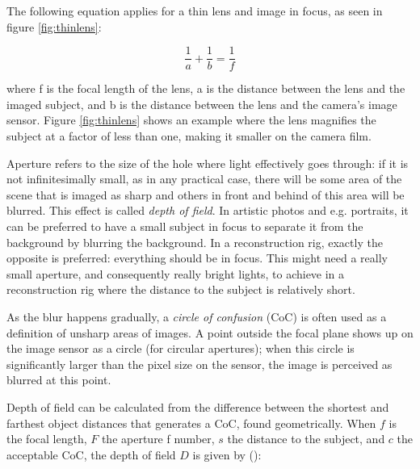 The following equation applies for a thin lens and image in focus, as seen in figure \ref{fig:thinlens}:

\begin{equation}
	\frac{1}{a} + \frac{1}{b} = \frac{1}{f} \label{eq:focal}
\end{equation}


where f is the focal length of the lens, a is the distance between the lens and the imaged subject, and b is the distance between the lens and the camera's image sensor. Figure \ref{fig:thinlens} shows an example where the lens magnifies the subject at a factor of less than one, making it smaller on the camera film.



Aperture refers to the size of the hole where light effectively goes through: %
if it is not infinitesimally small, as in any practical case, there will be some area of the scene that is imaged as sharp and others in front and behind of this area will be blurred.
This effect is called \emph{depth of field}.
In artistic photos and e.g. portraits, it can be preferred to have a small subject in focus to separate it from the background by blurring the background.
In a reconstruction rig, exactly the opposite is preferred: everything should be in focus.
This might need a really small aperture, and consequently really bright lights, to achieve in a reconstruction rig where the distance to the subject is relatively short.

As the blur happens gradually, a \emph{circle of confusion} (CoC) is often used as a definition of unsharp areas of images.
A point outside the focal plane shows up on the image sensor as a circle (for circular apertures); when this circle is significantly larger than the pixel size on the sensor, the image is perceived as blurred at this point.

Depth of field can be calculated from the difference between the shortest and farthest object distances that generates a CoC, found geometrically.
When $f$ is the focal length, $F$ the aperture f number, $s$ the distance to the subject, and $c$ the acceptable CoC, the depth of field $D$ is given by (\cite{greenleaf1950photographic}):

